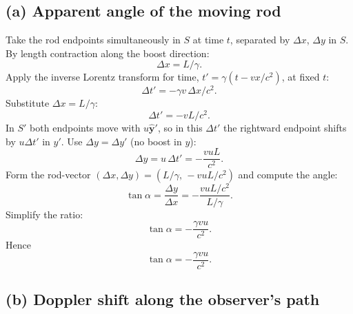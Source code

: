\documentclass[11pt]{article}
\begin{document}
\subsection*{(a) Apparent angle of the moving rod}

Take the rod endpoints simultaneously in $S$ at time $t$, separated by $\Delta x$, $\Delta y$ in $S$. By length contraction along the boost direction:
\[ \Delta x = L/\gamma. \]
Apply the inverse Lorentz transform for time, $t' = \gamma(t - vx/c^2)$, at fixed $t$:
\[ \Delta t' = -\gamma v\,\Delta x/c^2. \]
Substitute $\Delta x = L/\gamma$:
\[ \Delta t' = -vL/c^2. \]
In $S'$ both endpoints move with $u\hat{\bm y}'$, so in this $\Delta t'$ the rightward endpoint shifts by $u\Delta t'$ in $y'$. Use $\Delta y = \Delta y'$ (no boost in $y$):
\[ \Delta y = u\,\Delta t' = -\frac{vuL}{c^2}. \]
Form the rod-vector $(\Delta x,\Delta y) = (L/\gamma,\,-vuL/c^2)$ and compute the angle:
\[ \tan\alpha = \frac{\Delta y}{\Delta x} = -\frac{vuL/c^2}{L/\gamma}. \]
Simplify the ratio:
\[ \tan\alpha = -\frac{\gamma v u}{c^2}. \]
Hence
\begin{equation}
\boxed{\tan\alpha = -\frac{\gamma v u}{c^2}.}
\end{equation}

\subsection*{(b) Doppler shift along the observer's path}
\end{document}
